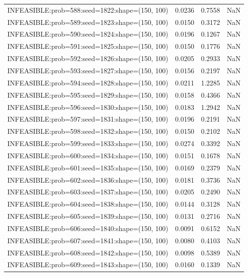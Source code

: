 \begin{longtable}{lccc}
INFEASIBLE:prob=588:seed=1822:shape=(150, 100) &   0.0236 &  0.7558 &    NaN \\
INFEASIBLE:prob=589:seed=1823:shape=(150, 100) &   0.0150 &  0.3172 &    NaN \\
INFEASIBLE:prob=590:seed=1824:shape=(150, 100) &   0.0196 &  0.1267 &    NaN \\
INFEASIBLE:prob=591:seed=1825:shape=(150, 100) &   0.0150 &  0.1776 &    NaN \\
INFEASIBLE:prob=592:seed=1826:shape=(150, 100) &   0.0205 &  0.2933 &    NaN \\
INFEASIBLE:prob=593:seed=1827:shape=(150, 100) &   0.0156 &  0.2197 &    NaN \\
INFEASIBLE:prob=594:seed=1828:shape=(150, 100) &   0.0211 &  1.2285 &    NaN \\
INFEASIBLE:prob=595:seed=1829:shape=(150, 100) &   0.0158 &  0.4366 &    NaN \\
INFEASIBLE:prob=596:seed=1830:shape=(150, 100) &   0.0183 &  1.2942 &    NaN \\
INFEASIBLE:prob=597:seed=1831:shape=(150, 100) &   0.0196 &  0.2191 &    NaN \\
INFEASIBLE:prob=598:seed=1832:shape=(150, 100) &   0.0150 &  0.2102 &    NaN \\
INFEASIBLE:prob=599:seed=1833:shape=(150, 100) &   0.0274 &  0.3392 &    NaN \\
INFEASIBLE:prob=600:seed=1834:shape=(150, 100) &   0.0151 &  0.1678 &    NaN \\
INFEASIBLE:prob=601:seed=1835:shape=(150, 100) &   0.0169 &  0.2379 &    NaN \\
INFEASIBLE:prob=602:seed=1836:shape=(150, 100) &   0.0181 &  0.3736 &    NaN \\
INFEASIBLE:prob=603:seed=1837:shape=(150, 100) &   0.0205 &  0.2490 &    NaN \\
INFEASIBLE:prob=604:seed=1838:shape=(150, 100) &   0.0144 &  0.3128 &    NaN \\
INFEASIBLE:prob=605:seed=1839:shape=(150, 100) &   0.0131 &  0.2716 &    NaN \\
INFEASIBLE:prob=606:seed=1840:shape=(150, 100) &   0.0091 &  0.6152 &    NaN \\
INFEASIBLE:prob=607:seed=1841:shape=(150, 100) &   0.0080 &  0.4103 &    NaN \\
INFEASIBLE:prob=608:seed=1842:shape=(150, 100) &   0.0098 &  0.5389 &    NaN \\
INFEASIBLE:prob=609:seed=1843:shape=(150, 100) &   0.0160 &  0.1339 &    NaN \\

\end{longtable}
